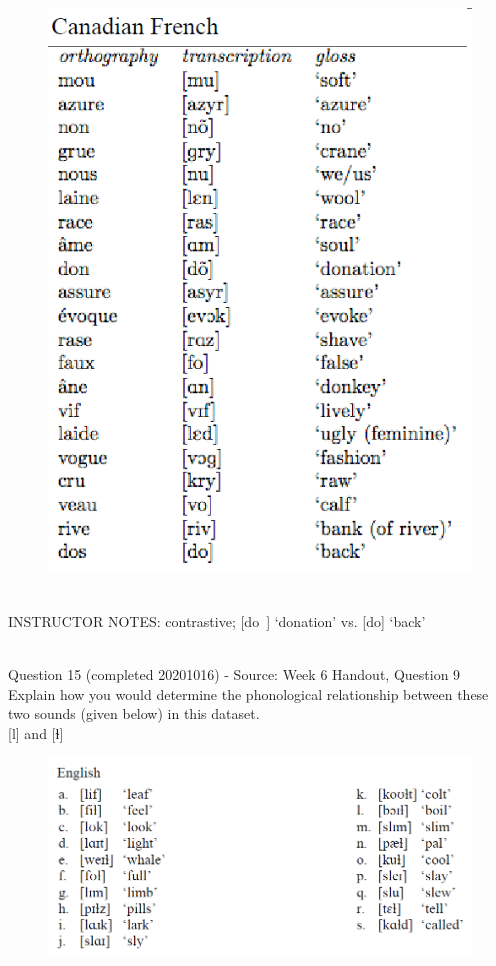 \documentclass[12pt]{article}
\begin{document}
\begin{figure}[H]
\includegraphics{../images/canadianfrench.png}
\end{figure}

~\\
INSTRUCTOR NOTES: contrastive; [do~] ‘donation’ vs. [do] ‘back’


~\\

{\large Question 15} (completed 20201016) - Source: Week 6 Handout, Question 9\\

Explain how you would determine the phonological relationship between these two sounds (given below) in this dataset.\\

{[l]} and {[ɫ]}

\begin{figure}[H]
\includegraphics{../images/english_laterals.png}
\end{figure}
\end{document}
